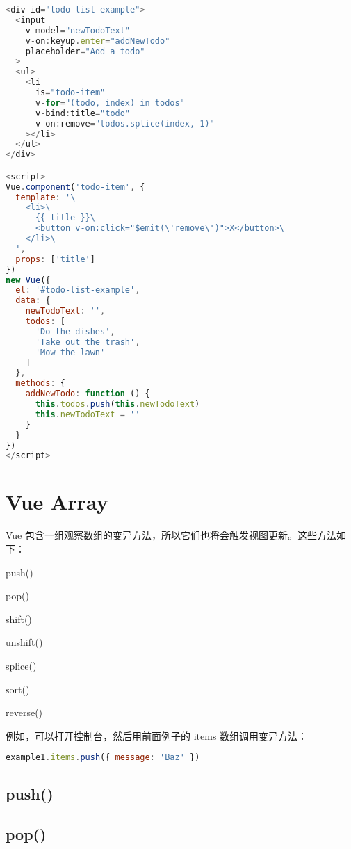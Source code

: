 \begin{lstlisting}[language=JavaScript]
<div id="todo-list-example">
  <input
    v-model="newTodoText"
    v-on:keyup.enter="addNewTodo"
    placeholder="Add a todo"
  >
  <ul>
    <li
      is="todo-item"
      v-for="(todo, index) in todos"
      v-bind:title="todo"
      v-on:remove="todos.splice(index, 1)"
    ></li>
  </ul>
</div>

<script>
Vue.component('todo-item', {
  template: '\
    <li>\
      {{ title }}\
      <button v-on:click="$emit(\'remove\')">X</button>\
    </li>\
  ',
  props: ['title']
})
new Vue({
  el: '#todo-list-example',
  data: {
    newTodoText: '',
    todos: [
      'Do the dishes',
      'Take out the trash',
      'Mow the lawn'
    ]
  },
  methods: {
    addNewTodo: function () {
      this.todos.push(this.newTodoText)
      this.newTodoText = ''
    }
  }
})
</script>
\end{lstlisting}

\chapter{Vue Array}

Vue 包含一组观察数组的变异方法，所以它们也将会触发视图更新。这些方法如下：

\begin{compactitem}
\item push()
\item pop()
\item shift()
\item unshift()
\item splice()
\item sort()
\item reverse()
\end{compactitem}

例如，可以打开控制台，然后用前面例子的 items 数组调用变异方法：


\begin{lstlisting}[language=JavaScript]
example1.items.push({ message: 'Baz' })
\end{lstlisting}


\section{push()}


\section{pop()}

